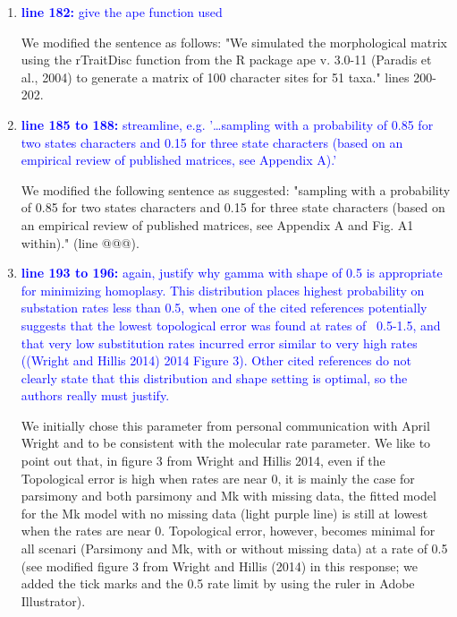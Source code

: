 \documentclass[12pt,letterpaper]{article}
\begin{document}
\begin{enumerate}
\item{\textcolor{blue}{\textbf{line 182:} give the ape function used}}

We modified the sentence as follows: "We simulated the morphological matrix using the rTraitDisc function from the R package ape v. 3.0-11 (Paradis et al., 2004) to generate a matrix of 100 character sites for 51 taxa." lines 200-202.

\item{\textcolor{blue}{\textbf{line 185 to 188:} streamline, e.g. '…sampling with a probability of 0.85 for two states characters and 0.15 for three state characters (based on an empirical review of published matrices, see Appendix A).'}}

We modified the following sentence as suggested: "sampling with a probability of 0.85 for two states characters and 0.15 for three state characters (based on an empirical review of published matrices, see Appendix A and Fig. A1 within)." (line @@@).

\item{\textcolor{blue}{\textbf{line 193 to 196:} again, justify why gamma with shape of 0.5 is appropriate for minimizing homoplasy. This distribution places highest probability on substation rates less than 0.5, when one of the cited references potentially suggests that the lowest topological error was found at rates of ~0.5-1.5, and that very low substitution rates incurred error similar to very high rates ((Wright and Hillis 2014) 2014 Figure 3). Other cited references do not clearly state that this distribution and shape setting is optimal, so the authors really must justify. }}

We initially chose this parameter from personal communication with April Wright and to be consistent with the molecular rate parameter.
We like to point out that, in figure 3 from Wright and Hillis 2014, even if the Topological error is high when rates are near 0, it is mainly the case for parsimony and both parsimony and Mk with missing data, the fitted model for the Mk model with no missing data (light purple line) is still at lowest when the rates are near 0.
Topological error, however, becomes minimal for all scenari (Parsimony and Mk, with or without missing data) at a rate of 0.5 (see modified figure 3 from Wright and Hillis (2014) in this response; we added the tick marks and the 0.5 rate limit by using the ruler in Adobe Illustrator).


\end{enumerate}
\end{document}
